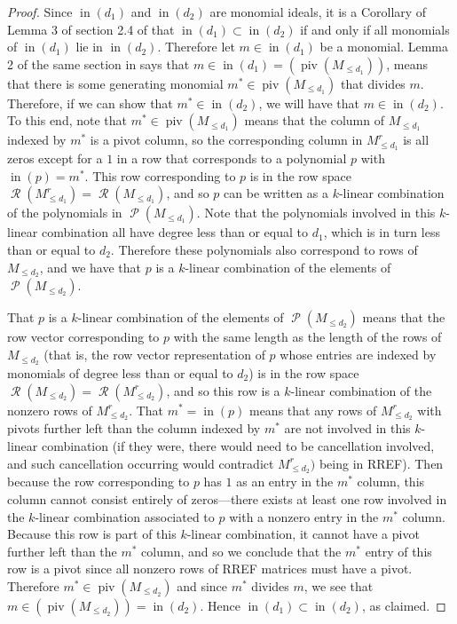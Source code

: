 \documentclass[11pt]{article}
\DeclareMathOperator{\Poly}{\mathscr{P}}
\DeclareMathOperator{\Row}{\mathscr{R}}
\DeclareMathOperator{\init}{in}
\DeclareMathOperator{\piv}{piv}
\theoremstyle{definition}
\begin{document}
\begin{proof}
	Since $\init(d_1)$ and $\init(d_2)$ are monomial ideals, it is a Corollary of Lemma 3 of section 2.4 of \cite{cox2013ideals} that $\init(d_1) \subset \init(d_2)$ if and only if all monomials of $\init(d_1)$ lie in $\init(d_2)$. Therefore let $m \in \init(d_1)$ be a monomial. Lemma 2 of the same section in \cite{cox2013ideals} says that $m \in \init(d_1) = (\piv(M_{\leq d_1}))$, means that there is some generating monomial $m^* \in \piv(M_{\leq d_1})$ that divides $m$. Therefore, if we can show that $m^* \in \init(d_2)$, we will have that $m \in \init(d_2)$. To this end, note that $m^* \in \piv(M_{\leq d_1})$ means that the column of $M_{\leq d_1}$ indexed by $m^*$ is a pivot column, so the corresponding column in $M_{\leq d_1}^r$ is all zeros except for a $1$ in a row that corresponds to a polynomial $p$ with $\init(p) = m^*$. This row corresponding to $p$ is in the row space $\Row(M_{\leq d_1}^r) = \Row(M_{\leq d_1})$, and so $p$ can be written as a $k$-linear combination of the polynomials in $\Poly(M_{\leq d_1})$. Note that the polynomials involved in this $k$-linear combination all have degree less than or equal to $d_1$, which is in turn less than or equal to $d_2$. Therefore these polynomials also correspond to rows of $M_{\leq d_2}$, and we have that $p$ is a $k$-linear combination of the elements of $\Poly(M_{\leq d_2})$. 

	That $p$ is a $k$-linear combination of the elements of $\Poly(M_{\leq d_2})$ means that the row vector corresponding to $p$ with the same length as the length of the rows of $M_{\leq d_2}$ (that is, the row vector representation of $p$ whose entries are indexed by monomials of degree less than or equal to $d_2$) is in the row space $\Row(M_{\leq d_2}) = \Row(M_{\leq d_2}^r)$, and so this row is a $k$-linear combination of the nonzero rows of $M_{\leq d_2}^r$. That $m^* = \init(p)$ means that any rows of $M_{\leq d_2}^r$ with pivots further left than the column indexed by $m^*$ are not involved in this $k$-linear combination (if they were, there would need to be cancellation involved, and such cancellation occurring would contradict $M_{\leq d_2}^r)$ being in RREF). Then because the row corresponding to $p$ has $1$ as an entry in the $m^*$ column, this column cannot consist entirely of zeros---there exists at least one row involved in the $k$-linear combination associated to $p$ with a nonzero entry in the $m^*$ column. Because this row is part of this $k$-linear combination, it cannot have a pivot further left than the $m^*$ column, and so we conclude that the $m^*$ entry of this row is a pivot since all nonzero rows of RREF matrices must have a pivot. Therefore $m^* \in \piv(M_{\leq d_2})$ and since $m^*$ divides $m$, we see that $m \in (\piv(M_{\leq d_2})) = \init(d_2)$. Hence $\init(d_1) \subset \init(d_2)$, as claimed. 
\end{proof}
\end{document}
